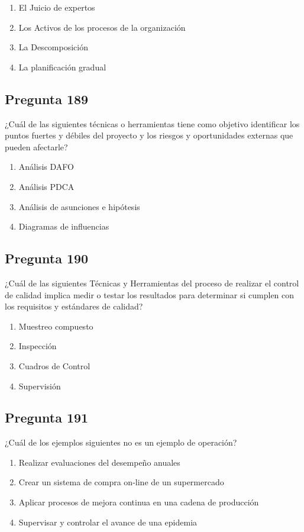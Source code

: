 \documentclass[11pt,a4paper]{article}
\begin{document}
\begin{enumerate}[label=\alph*)]
  \item El Juicio de expertos
  \item Los Activos de los procesos de la organización
  \item La Descomposición
  \item La planificación gradual
\end{enumerate}

\subsection*{Pregunta 189}
¿Cuál de las siguientes técnicas o herramientas tiene como objetivo identificar los puntos fuertes y débiles del proyecto y los riesgos y oportunidades externas que pueden afectarle?

\begin{enumerate}[label=\alph*)]
  \item Análisis DAFO
  \item Análisis PDCA
  \item Análisis de asunciones e hipótesis
  \item Diagramas de influencias
\end{enumerate}

\subsection*{Pregunta 190}
¿Cuál de las siguientes Técnicas y Herramientas del proceso de realizar el control de calidad implica medir o testar los resultados para determinar si cumplen con los requisitos y estándares de calidad?

\begin{enumerate}[label=\alph*)]
  \item Muestreo compuesto
  \item Inspección
  \item Cuadros de Control
  \item Supervisión
\end{enumerate}

\subsection*{Pregunta 191}
¿Cuál de los ejemplos siguientes no es un ejemplo de operación?

\begin{enumerate}[label=\alph*)]
  \item Realizar evaluaciones del desempeño anuales
  \item Crear un sistema de compra on-line de un supermercado
  \item Aplicar procesos de mejora continua en una cadena de producción
  \item Supervisar y controlar el avance de una epidemia
\end{enumerate}
\end{document}
